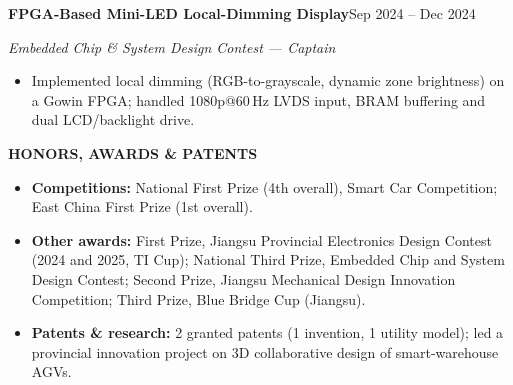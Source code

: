 \documentclass[10pt,a4paper]{article}
\newcommand{\cvsection}[1]{%
  \vspace{0.55em}%
  {\color{accent}\bfseries\large\MakeUppercase{#1}}\par
  \vspace{-0.50em}{\color{hairline}\rule{\linewidth}{0.7pt}}\par
  \vspace{0.20em}%
}
\newcommand{\cventry}[3]{%
  \textbf{#1}\hfill{\small\color{muted}#2}\par
  {\itshape #3}\par
}
\newenvironment{cvitems}{%
  \begin{itemize}[leftmargin=1.05em,labelsep=0.50em,itemsep=0.4pt,
                  topsep=1.0pt,parsep=0pt,partopsep=0pt]\small
}{\end{itemize}}
\begin{document}
\cventry{FPGA-Based Mini-LED Local-Dimming Display}{Sep 2024 -- Dec 2024}%
  {Embedded Chip \& System Design Contest --- Captain}
\begin{cvitems}
  \item Implemented local dimming (RGB-to-grayscale, dynamic zone brightness) on a
        Gowin FPGA; handled 1080p@60\,Hz LVDS input, BRAM buffering and dual
        LCD/backlight drive.
\end{cvitems}

\cvsection{Honors, Awards \& Patents}
\begin{cvitems}
  \item \textbf{Competitions:} National First Prize (4th overall), Smart Car
        Competition; East China First Prize (1st overall).
  \item \textbf{Other awards:} First Prize, Jiangsu Provincial Electronics Design
        Contest (2024 and 2025, TI Cup); National Third Prize, Embedded Chip and
        System Design Contest; Second Prize, Jiangsu Mechanical Design Innovation
        Competition; Third Prize, Blue Bridge Cup (Jiangsu).
  \item \textbf{Patents \& research:} 2 granted patents (1 invention, 1 utility
        model); led a provincial innovation project on 3D collaborative design of
        smart-warehouse AGVs.
\end{cvitems}
\end{document}
